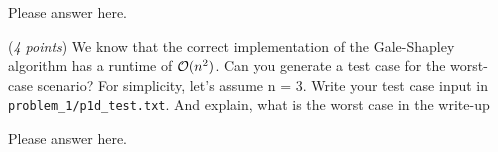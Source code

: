 \documentclass{hw_template}
\begin{document}
\begin{problem}
\begin{solution}
Please answer here.
\end{solution}

\begin{subproblem}
\newcommand{\worstrank}{{\tt wr}}
  (\textit{4 points})
    We know that the correct implementation of the Gale-Shapley algorithm has a runtime of $\mathcal{O}(n^2)$.  Can you generate a test case for the worst-case scenario? For simplicity, let's assume n = 3. Write your test case input in \texttt{problem\_1/p1d\_test.txt}. And explain, what is the worst case in the write-up
\end{subproblem}

\begin{solution}
Please answer here.
\end{solution}

\end{problem}


\newpage
\end{document}
